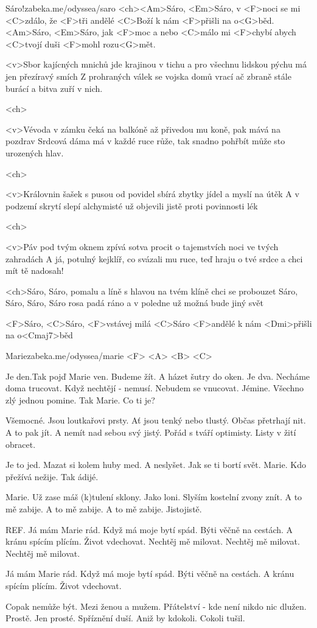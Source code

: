


\songtitlepage

\begin{song}[Traband]{1}{Sáro!}{zabeka.me/odyssea/saro}
<ch><Am>Sáro, <Em>Sáro, v <F>noci se mi <C>zdálo,
že <F>tři andělé <C>Boží k nám <F>přišli na o<G>běd.
<Am>Sáro, <Em>Sáro, jak <F>moc a nebo <C>málo
mi <F>chybí abych <C>tvojí duši <F>mohl rozu<G>mět.

<v>Sbor kajícných mnichů jde krajinou v tichu 
a pro všechnu lidskou pýchu má jen přezíravý smích 
Z prohraných válek se vojska domů vrací 
ač zbraně stále burácí a bitva zuří v nich.

<ch>

<v>Vévoda v zámku čeká na balkóně 
až přivedou mu koně, pak mává na pozdrav 
Srdcová dáma má v každé ruce růže, 
tak snadno pohřbít může sto urozených hlav.

<ch>

<v>Královnin šašek s pusou od povidel 
sbírá zbytky jídel a myslí na útěk 
A v podzemí skrytí slepí alchymisté 
už objevili jistě proti povinnosti lék

<ch>

<v>Páv pod tvým oknem zpívá sotva procit 
o tajemstvích noci ve tvých zahradách 
A já, potulný kejklíř, co svázali mu ruce, 
teď hraju o tvé srdce a chci mít tě nadosah!

<ch>Sáro, Sáro, pomalu a líně 
s hlavou na tvém klíně chci se probouzet 
Sáro, Sáro, Sáro, Sáro rosa padá ráno 
a v poledne už možná bude jiný svět

<F>Sáro, <C>Sáro, <F>vstávej milá <C>Sáro 
<F>andělé k nám <Dmi>přišli na o<Cmaj7>běd


\end{song}
\begin{song}{2}{Marie}{zabeka.me/odyssea/marie}
<F> <A> <B> <C>

Je den.Tak pojď Marie ven.
Budeme žít. A házet šutry do oken.
Je dva. Necháme doma trucovat.
Když nechtějí - nemusí. Nebudem se vnucovat. 
Jémine. Všechno zlý jednou pomine.
Tak Marie. Co ti je?

Všemocné. Jsou loutkařovi prsty.
Ať jsou tenký nebo tlustý. Občas přetrhají nit.
A to pak jít. A nemít nad sebou svý jistý.
Pořád s tváří optimisty. Listy v žití obracet.

Je to jed. Mazat si kolem huby med.
A neslyšet. Jak se ti bortí svět.
Marie. Kdo přežívá nežije. Tak ádijé.

Marie. Už zase máš (k)tulení sklony.
Jako loni. Slyším kostelní zvony znít.
A to mě zabije. A to mě zabije.
A to mě zabije. Jistojistě.

REF.
Já mám Marie rád. Když má moje bytí spád.
Býti věčně na cestách. A kránu spícím plícím.
Život vdechovat. Nechtěj mě milovat.
Nechtěj mě milovat. Nechtěj mě milovat.

Já mám Marie rád. Když má moje bytí spád.
Býti věčně na cestách. A kránu spícím plícím.
Život vdechovat.

Copak nemůže být. Mezi ženou a mužem.
Přátelství - kde není nikdo nic dlužen. Prostě.
Jen prosté. Spříznění duší.
Aniž by kdokoli. Cokoli tušil.

\end{song}

